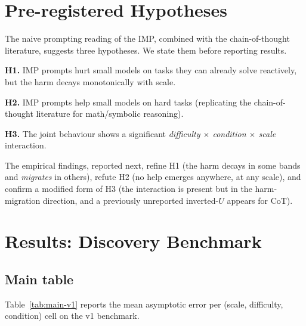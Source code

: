 \documentclass[11pt]{article}
\begin{document}
\section{Pre-registered Hypotheses}
\label{sec:hypotheses}

The naive prompting reading of the IMP, combined with the
chain-of-thought literature, suggests three hypotheses.  We
state them before reporting results.

\textbf{H1.}  IMP prompts hurt small models on tasks they can
already solve reactively, but the harm decays monotonically with
scale.

\textbf{H2.}  IMP prompts help small models on hard tasks
(replicating the chain-of-thought literature for math/symbolic
reasoning).

\textbf{H3.}  The joint behaviour shows a significant
\emph{difficulty $\times$ condition $\times$ scale} interaction.

The empirical findings, reported next, refine H1 (the harm decays
in some bands and \emph{migrates} in others), refute H2 (no help
emerges anywhere, at any scale), and confirm a modified form of
H3 (the interaction is present but in the
harm-migration direction, and a previously unreported inverted-$U$
appears for CoT).

\section{Results: Discovery Benchmark}
\label{sec:results-v1}

\subsection{Main table}
Table~\ref{tab:main-v1} reports the mean asymptotic error per
(scale, difficulty, condition) cell on the v1 benchmark.
\end{document}
